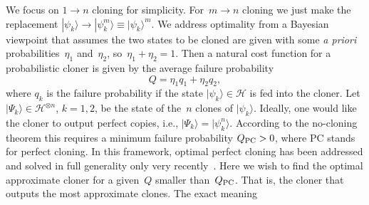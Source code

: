 \documentclass[aps,pra,twocolumn,showpacs]{revtex4-1}
\begin{document}
 We focus on $1\to n$ cloning for simplicity. For~\mbox{$m\to n$} cloning we just make the replacement $|\psi_k\rangle\to|\psi_k^m\rangle\equiv|\psi_k\rangle^{m}$.
We address optimality from a Bayesian viewpoint that assumes the two states to be cloned are given with some {\it a priori}  probabilities~$\eta_1$ and~$\eta_2$, so~$\eta_1+\eta_2=1$. Then a natural cost function for a probabilistic cloner is given by the average failure probability 
%
\begin{equation}
Q=\eta_1 q_1+\eta_2 q_2,
\label{obj fun}
\end{equation}
where $q_k$ is the failure probability if the state $|\psi_k\rangle\in{\mathscr H}$ is fed into the cloner. Let $|\Psi_k\rangle\in{\mathscr H}^{\otimes n}$, $k=1,2$, be the state of the~$n$ clones of $|\psi_k\rangle$. 
Ideally, one would like the cloner to output perfect copies, i.e.,  $|\Psi_k\rangle=|\psi^n_k\rangle$. According to the no-cloning theorem this requires a minimum failure probability $Q_{\rm PC}>0$, where PC stands for perfect cloning. In this framework, optimal perfect cloning has been addressed and solved in full generality only very recently~\cite{us1}. Here we wish to find the optimal approximate cloner
for a given~$Q$ smaller than~$Q_{\rm PC}$. That is, the cloner that outputs the most approximate clones. The exact meaning
\end{document}

